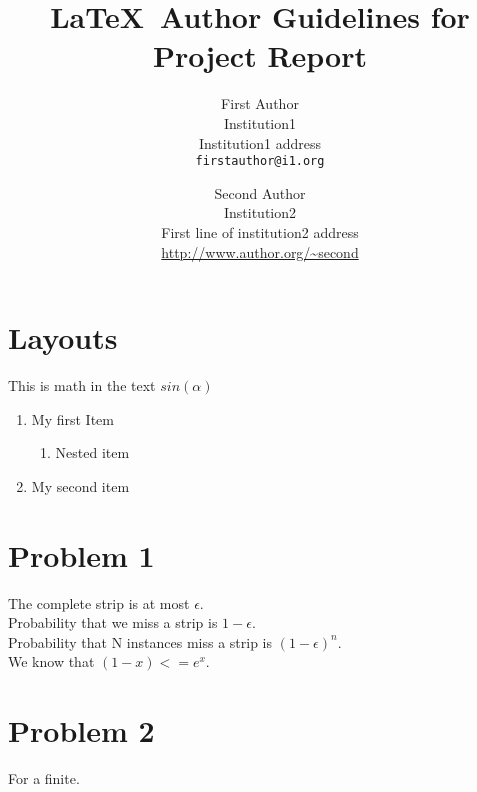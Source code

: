 \documentclass[10pt,twocolumn,letterpaper]{article}
\begin{document}
\title{\LaTeX\ Author Guidelines for Project Report}

\author{First Author\\
Institution1\\
Institution1 address\\
{\tt\small firstauthor@i1.org}
\and
Second Author\\
Institution2\\
First line of institution2 address\\
{\small\url{http://www.author.org/~second}}
}

\maketitle


\section{Layouts}

This is math in the text $sin(\alpha)$
\begin{enumerate}
\item My first Item
	\begin{enumerate}
	\item Nested item
	\end{enumerate}
\item My second item
\end{enumerate}


\section{Problem 1}

The complete strip is at most $\epsilon$.\\
Probability that we miss a strip is $1-\epsilon$.\\
Probability that N instances miss a strip is $(1-\epsilon)^n$.\\
We know that $(1-x)<=e^x$.\\

\section{Problem 2}
For a finite.
\end{document}
